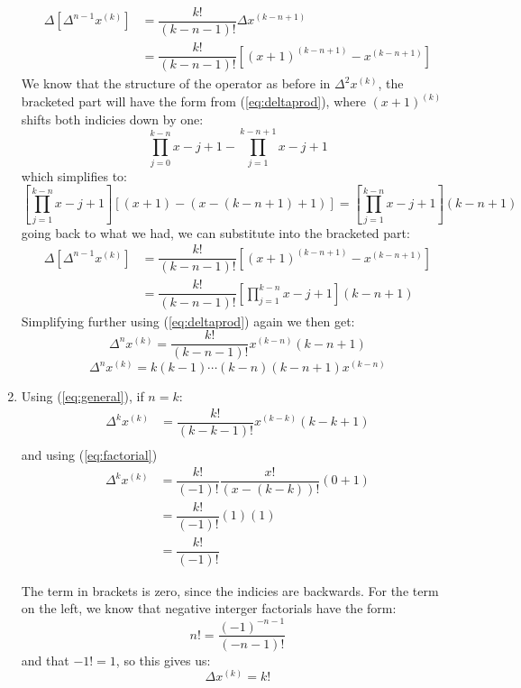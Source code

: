 \documentclass[12pt,letterpaper]{article}
\theoremstyle{definition}
\begin{document}
\begin{changemargin}{.5cm}{0cm}
\begin{enumerate}[label=(\roman*)]
    \begin{align*}
        \Delta\left[\Delta^{n-1}x^{(k)}\right] &= \dfrac{k!}{(k-n-1)!}\Delta x^{(k-n+1)}\\
        &= \dfrac{k!}{(k-n-1)!}\left[ (x+1)^{(k-n+1)}-x^{(k-n+1)}\right]
    \end{align*}
    We know that the structure of the operator as before in $\displaystyle \Delta^2 x^{(k)}$, the bracketed part will have the form from (\ref{eq:deltaprod}), where $(x+1)^{(k)}$ shifts both indicies down by one:
    \begin{equation*}
        \prod_{j=0}^{k-n} x-j+1 - \prod_{j=1}^{k-n+1} x-j+1
    \end{equation*}
    which simplifies to:
    \begin{equation*}
        \left[\prod_{j=1}^{k-n}x-j+1\right] [(x+1)-(x-(k-n+1)+1) ] = \left[\prod_{j=1}^{k-n}x-j+1\right] (k-n+1)
    \end{equation*}
    going back to what we had, we can substitute into the bracketed part: 
    \begin{align*}
        \Delta\left[\Delta^{n-1}x^{(k)}\right] &= \dfrac{k!}{(k-n-1)!}\left[ (x+1)^{(k-n+1)}-x^{(k-n+1)}\right]\\
        &= \dfrac{k!}{(k-n-1)!}\left[\prod_{j=1}^{k-n}x-j+1\right] (k-n+1)
    \end{align*}
    Simplifying further using (\ref{eq:deltaprod}) again we then get:
    \begin{equation}\label{eq:general}
        \Delta^nx^{(k)}=\dfrac{k!}{(k-n-1)!}x^{(k-n)} (k-n+1)
    \end{equation}
    \begin{equation*}
        \Delta^nx^{(k)}=k(k-1)\cdots(k-n)(k-n+1)x^{(k-n)} 
    \end{equation*}
    \item Using (\ref{eq:general}), if $n=k$:
    \begin{align*}
        \Delta^kx^{(k)}&=\dfrac{k!}{(k-k-1)!}x^{(k-k)} (k-k+1)\\
    \end{align*}
    and using (\ref{eq:factorial})
    \begin{align*}
        \Delta^kx^{(k)}&=\dfrac{k!}{(-1)!}\dfrac{x!}{(x-(k-k))!} (0+1)\\
        &= \dfrac{k!}{(-1)!} (1)(1)\\
        &=\dfrac{k!}{(-1)!}
    \end{align*}
        
    
    The term in brackets is zero, since the indicies are backwards. For the term on the left, we know that negative interger factorials have the form:
    \begin{equation*}
        n! = \dfrac{(-1)^{-n-1}}{(-n-1)!}
    \end{equation*}
    and that $-1! = 1$, so this gives us:
    \begin{equation*}
        \Delta x^{(k)} = k!
    \end{equation*}
\end{enumerate}

\end{changemargin}
\newpage
\end{document}
